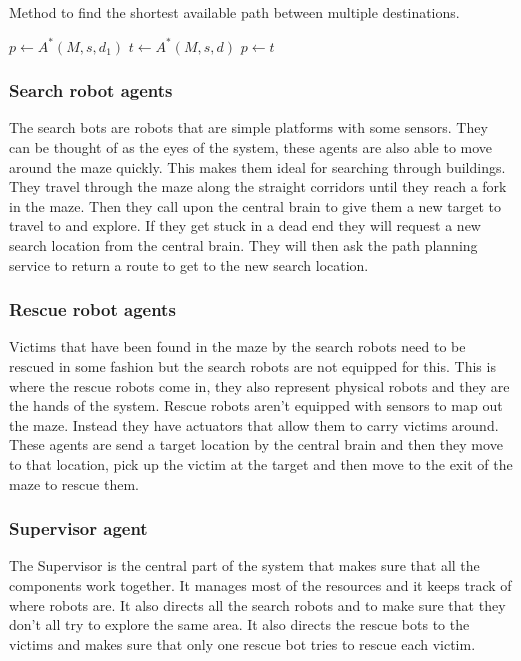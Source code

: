 \begin{algorithm}
	\caption{Method to find the shortest available path between multiple
		destinations.}
	\label{alg:multidest}
	\begin{algorithmic}[1]
		\STATE $p \gets A^*(M, s, d_1)$
			\STATE $t \gets A^*(M, s, d)$
				\STATE $p \gets t$
			\ENDIF
		\ENDFOR
	\end{algorithmic}
\end{algorithm}

\subsubsection{Search robot agents}
The search bots are robots that are simple platforms with some sensors. They
can be thought of as the eyes of the system, these agents are also able to move
around the maze quickly. This makes them ideal for searching through buildings.
They travel through the maze along the straight corridors until they reach a
fork in the maze. Then they call upon the central brain to give them a new
target to travel to and explore. If they get stuck in a dead end they will
request a new search location from the central brain. They will then ask the
path planning service to return a route to get to the new search location.

\subsubsection{Rescue robot agents}
Victims that have been found in the maze by the search robots need to be
rescued in some fashion but the search robots are not equipped for this. This
is where the rescue robots come in, they also represent physical robots and
they are the hands of the system. Rescue robots aren't equipped with sensors to
map out the maze. Instead they have actuators that allow them to carry victims
around. These agents are send a target location by the central brain and then
they move to that location, pick up the victim at the target and then move to
the exit of the maze to rescue them.

\subsubsection{Supervisor agent}
The Supervisor is the central part of the system that makes sure that all
the components work together. It manages most of the resources and it keeps
track of where robots are. It also directs all the search robots and to make
sure that they don't all try to explore the same area. It also directs the
rescue bots to the victims and makes sure that only one rescue bot tries to
rescue each victim.

